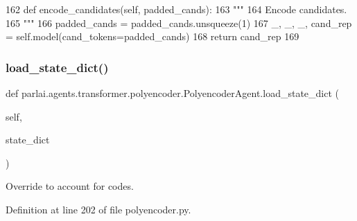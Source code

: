 \begin{DoxyCode}
162     \textcolor{keyword}{def }encode\_candidates(self, padded\_cands):
163         \textcolor{stringliteral}{"""}
164 \textcolor{stringliteral}{        Encode candidates.}
165 \textcolor{stringliteral}{        """}
166         padded\_cands = padded\_cands.unsqueeze(1)
167         \_, \_, \_, cand\_rep = self.model(cand\_tokens=padded\_cands)
168         \textcolor{keywordflow}{return} cand\_rep
169 
\end{DoxyCode}
\mbox{\label{classparlai_1_1agents_1_1transformer_1_1polyencoder_1_1PolyencoderAgent_a4b6301664c0a7e98e9c688cc75ca79dc}} 
\subsubsection{\texorpdfstring{load\+\_\+state\+\_\+dict()}{load\_state\_dict()}}
{\footnotesize\ttfamily def parlai.\+agents.\+transformer.\+polyencoder.\+Polyencoder\+Agent.\+load\+\_\+state\+\_\+dict (\begin{DoxyParamCaption}\item[{}]{self,  }\item[{}]{state\+\_\+dict }\end{DoxyParamCaption})}

\begin{DoxyVerb}Override to account for codes.
\end{DoxyVerb}
 

Definition at line 202 of file polyencoder.\+py.



